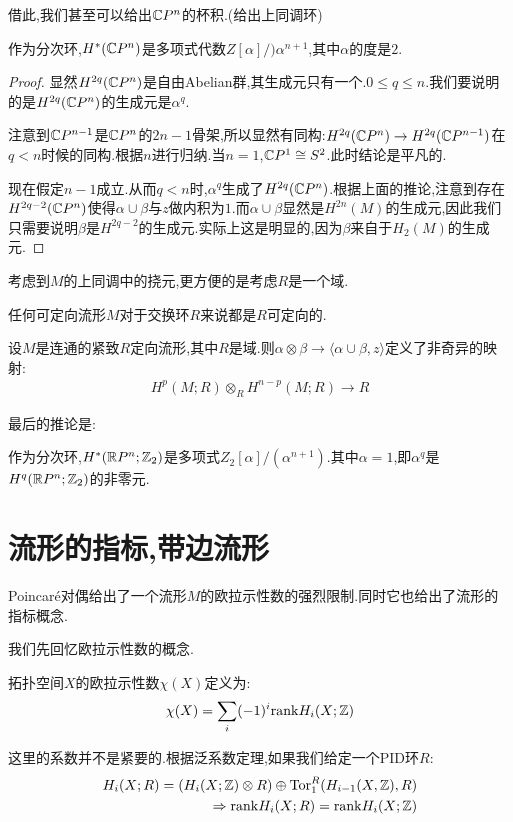 借此,我们甚至可以给出$\mathbb{C} P^n$的杯积.(给出上同调环)
\begin{corollary}
    作为分次环,$H^*(\mathbb{C} P^n)$是多项式代数$Z[\alpha]/)\alpha^{n+1}$,其中$\alpha$的度是$2$.
\end{corollary}
\begin{proof}
显然$H^{2q}(\mathbb{C} P^n)$是自由Abelian群,其生成元只有一个.$0\leq q \leq n$.我们要说明的是$H^{2q}(\mathbb{C} P^n)$的生成元是$\alpha^q$.

注意到$\mathbb{C} P^{n-1}$是$\mathbb{C} P^{n}$的$2n-1$骨架,所以显然有同构:$H^{2q}(\mathbb{C} P^n) \to H^{2q}(\mathbb{C} P^{n-1})$在$q<n$时候的同构.根据$n$进行归纳.当$n=1$,$\mathbb{C} P^1 \cong S^2$.此时结论是平凡的.

现在假定$n-1$成立.从而$q<n$时,$\alpha^q$生成了$H^{2q}(\mathbb{C} P^n)$.根据上面的推论,注意到存在$H^{2q-2}(\mathbb{C} P^n)$使得$\alpha \cup \beta$与$z$做内积为$1$.而$\alpha \cup \beta$显然是$H^{2n}(M)$的生成元,因此我们只需要说明$\beta$是$H^{2q-2}$的生成元.实际上这是明显的,因为$\beta$来自于$H_2(M)$的生成元.
\end{proof}
考虑到$M$的上同调中的挠元,更方便的是考虑$R$是一个域.
\begin{proposition}
    任何可定向流形$M$对于交换环$R$来说都是$R$可定向的.
\end{proposition}
\begin{proposition}
    设$M$是连通的紧致$R$定向流形,其中$R$是域.则$\alpha \otimes \beta \to \langle \alpha\cup \beta,z\rangle$定义了非奇异的映射:
    \begin{align*}
        H^p(M;R)\otimes_R H^{n-p}(M;R)\to R
    \end{align*}
\end{proposition}
最后的推论是:
\begin{corollary}
    作为分次环,$H^*(\mathbb{R} P^n;\mathbb{Z}_2)$是多项式$Z_2[\alpha]/(\alpha^{n+1})$.其中$\alpha=1$,即$\alpha^q$是$H^q(\mathbb{R} P^n;\mathbb{Z}_2)$的非零元.
\end{corollary}
\chapter{流形的指标,带边流形}
Poincar\'{e}对偶给出了一个流形$M$的欧拉示性数的强烈限制.同时它也给出了流形的指标概念.

我们先回忆欧拉示性数的概念.
\begin{definition}
    拓扑空间$X$的欧拉示性数$\chi(X)$定义为:
    \begin{align*}
        \chi(X)=\sum_{i}(-1)^i \mathrm{rank}H_i(X;\mathbb{Z})
    \end{align*}
\end{definition}
这里的系数并不是紧要的.根据泛系数定理,如果我们给定一个PID环$R$:
\begin{align*}
    H_i(X;R)=(H_i(X;\mathbb{Z})\otimes R)\oplus \mathrm{Tor}_{1}^{R}(H_{i-1}(X,\mathbb{Z}),R)   \\ \Rightarrow \mathrm{rank}H_i(X;R)=\mathrm{rank}H_i(X;\mathbb{Z})
\end{align*}

